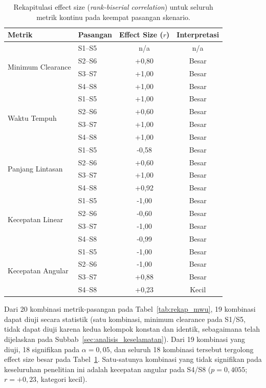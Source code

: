 \begin{table}[H]
\centering
\caption{Rekapitulasi effect size (\textit{rank-biserial correlation})
untuk seluruh metrik kontinu pada keempat pasangan skenario.}
\label{tab:rekap_effect_size}
\begin{tabular}{llcc}
\toprule
\textbf{Metrik} & \textbf{Pasangan} & \textbf{Effect Size ($r$)} & \textbf{Interpretasi} \\
\midrule
\multirow{4}{*}{Minimum Clearance}
 & S1--S5 & n/a   & n/a \\
 & S2--S6 & +0,80 & Besar \\
 & S3--S7 & +1,00 & Besar \\
 & S4--S8 & +1,00 & Besar \\
\midrule
\multirow{4}{*}{Waktu Tempuh}
 & S1--S5 & +1,00 & Besar \\
 & S2--S6 & +0,60 & Besar \\
 & S3--S7 & +1,00 & Besar \\
 & S4--S8 & +1,00 & Besar \\
\midrule
\multirow{4}{*}{Panjang Lintasan}
 & S1--S5 & -0,58 & Besar \\
 & S2--S6 & +0,60 & Besar \\
 & S3--S7 & +1,00 & Besar \\
 & S4--S8 & +0,92 & Besar \\
\midrule
\multirow{4}{*}{Kecepatan Linear}
 & S1--S5 & -1,00 & Besar \\
 & S2--S6 & -0,60 & Besar \\
 & S3--S7 & -1,00 & Besar \\
 & S4--S8 & -0,99 & Besar \\
\midrule
\multirow{4}{*}{Kecepatan Angular}
 & S1--S5 & -1,00 & Besar \\
 & S2--S6 & -1,00 & Besar \\
 & S3--S7 & +0,88 & Besar \\
 & S4--S8 & +0,23 & Kecil \\
\bottomrule
\end{tabular}
\end{table}

Dari 20 kombinasi metrik-pasangan pada Tabel~\ref{tab:rekap_mwu}, 19
kombinasi dapat diuji secara statistik (satu kombinasi, minimum clearance
pada S1/S5, tidak dapat diuji karena kedua kelompok konstan dan identik,
sebagaimana telah dijelaskan pada Subbab~\ref{sec:analisis_keselamatan}).
Dari 19 kombinasi yang diuji, 18 signifikan pada $\alpha=0,05$, dan seluruh
18 kombinasi tersebut tergolong effect size besar pada
Tabel~\ref{tab:rekap_effect_size}. Satu-satunya kombinasi yang tidak
signifikan pada keseluruhan penelitian ini adalah kecepatan angular pada
S4/S8 ($p=0,4055$; $r=+0,23$, kategori kecil).

